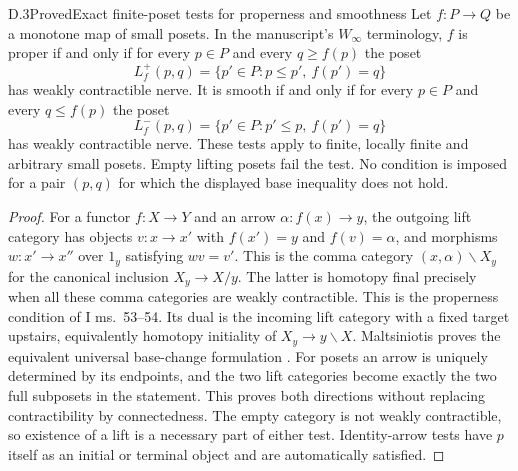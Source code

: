 \begin{statement}{D.3}{Proved}{Exact finite-poset tests for properness and smoothness}
Let $f:P\to Q$ be a monotone map of small posets. In the manuscript's $W_\infty$ terminology, $f$ is proper if and only if for every $p\in P$ and every $q\geq f(p)$ the poset
\[
 L_f^+(p,q)=\{p'\in P:p\leq p',\ f(p')=q\}
\]
has weakly contractible nerve. It is smooth if and only if for every $p\in P$ and every $q\leq f(p)$ the poset
\[
 L_f^-(p,q)=\{p'\in P:p'\leq p,\ f(p')=q\}
\]
has weakly contractible nerve. These tests apply to finite, locally finite and arbitrary small posets. Empty lifting posets fail the test. No condition is imposed for a pair $(p,q)$ for which the displayed base inequality does not hold.
\end{statement}
\begin{proof}
For a functor $f:X\to Y$ and an arrow $\alpha:f(x)\to y$, the outgoing lift category has objects $v:x\to x'$ with $f(x')=y$ and $f(v)=\alpha$, and morphisms $w:x'\to x''$ over $1_y$ satisfying $wv=v'$. This is the comma category $(x,\alpha)\backslash X_y$ for the canonical inclusion $X_y\to X/y$. The latter is homotopy final precisely when all these comma categories are weakly contractible. This is the properness condition of I ms.~53--54. Its dual is the incoming lift category with a fixed target upstairs, equivalently homotopy initiality of $X_y\to y\backslash X$. Maltsiniotis proves the equivalent universal base-change formulation \citep[Theorem~1.2 and its proper dual]{CDMaltsiniotis2005}. For posets an arrow is uniquely determined by its endpoints, and the two lift categories become exactly the two full subposets in the statement. This proves both directions without replacing contractibility by connectedness. The empty category is not weakly contractible, so existence of a lift is a necessary part of either test. Identity-arrow tests have $p$ itself as an initial or terminal object and are automatically satisfied.
\end{proof}

